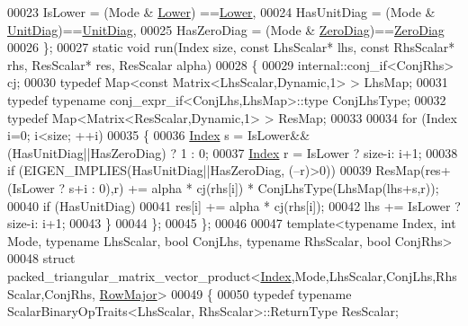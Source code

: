 \begin{DoxyCode}
00023     IsLower     = (Mode & \hyperlink{group__enums_gga39e3366ff5554d731e7dc8bb642f83cda891792b8ed394f7607ab16dd716f60e6}{Lower})   ==\hyperlink{group__enums_gga39e3366ff5554d731e7dc8bb642f83cda891792b8ed394f7607ab16dd716f60e6}{Lower},
00024     HasUnitDiag = (Mode & \hyperlink{group__enums_gga39e3366ff5554d731e7dc8bb642f83cdaddb72f888ac85d5a1c52333e54f9374b}{UnitDiag})==\hyperlink{group__enums_gga39e3366ff5554d731e7dc8bb642f83cdaddb72f888ac85d5a1c52333e54f9374b}{UnitDiag},
00025     HasZeroDiag = (Mode & \hyperlink{group__enums_gga39e3366ff5554d731e7dc8bb642f83cda884ff7240392e85aa6e4b3c957e36483}{ZeroDiag})==\hyperlink{group__enums_gga39e3366ff5554d731e7dc8bb642f83cda884ff7240392e85aa6e4b3c957e36483}{ZeroDiag}
00026   \};
00027   \textcolor{keyword}{static} \textcolor{keywordtype}{void} run(Index size, \textcolor{keyword}{const} LhsScalar* lhs, \textcolor{keyword}{const} RhsScalar* rhs, ResScalar* res, ResScalar alpha)
00028   \{
00029     internal::conj\_if<ConjRhs> cj;
00030     \textcolor{keyword}{typedef} Map<const Matrix<LhsScalar,Dynamic,1> > LhsMap;
00031     \textcolor{keyword}{typedef} \textcolor{keyword}{typename} conj\_expr\_if<ConjLhs,LhsMap>::type ConjLhsType;
00032     \textcolor{keyword}{typedef} Map<Matrix<ResScalar,Dynamic,1> > ResMap;
00033 
00034     \textcolor{keywordflow}{for} (Index i=0; i<size; ++i)
00035     \{
00036       \hyperlink{namespace_eigen_a62e77e0933482dafde8fe197d9a2cfde}{Index} s = IsLower&&(HasUnitDiag||HasZeroDiag) ? 1 : 0;
00037       \hyperlink{namespace_eigen_a62e77e0933482dafde8fe197d9a2cfde}{Index} r = IsLower ? size-i: i+1;
00038       \textcolor{keywordflow}{if} (EIGEN\_IMPLIES(HasUnitDiag||HasZeroDiag, (--r)>0))
00039     ResMap(res+(IsLower ? s+i : 0),r) += alpha * cj(rhs[i]) * ConjLhsType(LhsMap(lhs+s,r));
00040       \textcolor{keywordflow}{if} (HasUnitDiag)
00041     res[i] += alpha * cj(rhs[i]);
00042       lhs += IsLower ? size-i: i+1;
00043     \}
00044   \};
00045 \};
00046 
00047 \textcolor{keyword}{template}<\textcolor{keyword}{typename} Index, \textcolor{keywordtype}{int} Mode, \textcolor{keyword}{typename} LhsScalar, \textcolor{keywordtype}{bool} ConjLhs, \textcolor{keyword}{typename} RhsScalar, \textcolor{keywordtype}{bool} ConjRhs>
00048 \textcolor{keyword}{struct }packed\_triangular\_matrix\_vector\_product<\hyperlink{namespace_eigen_a62e77e0933482dafde8fe197d9a2cfde}{Index},Mode,LhsScalar,ConjLhs,RhsScalar,ConjRhs,
      \hyperlink{group__enums_ggaacded1a18ae58b0f554751f6cdf9eb13acfcde9cd8677c5f7caf6bd603666aae3}{RowMajor}>
00049 \{
00050   \textcolor{keyword}{typedef} \textcolor{keyword}{typename} ScalarBinaryOpTraits<LhsScalar, RhsScalar>::ReturnType ResScalar;

\end{DoxyCode}
